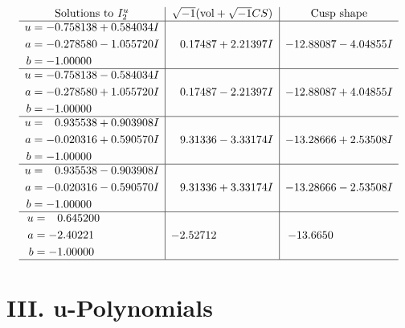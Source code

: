 \documentclass[1p]{elsarticle_modified}
\theoremstyle{definition}
\newcommand{\I}{\sqrt{-1}}
\begin{document}
$$\begin{array}{c|c|c}  
\text{Solutions to }I^u_{2}& \I (\text{vol} + \sqrt{-1}CS) & \text{Cusp shape}\\
 \hline 
\begin{aligned}
u &= -0.758138 + 0.584034 I \\
a &= -0.278580 - 1.055720 I \\
b &= -1.00000\phantom{ +0.000000I}\end{aligned}
 & \phantom{-}0.17487 + 2.21397 I & -12.88087 - 4.04855 I \\ \hline\begin{aligned}
u &= -0.758138 - 0.584034 I \\
a &= -0.278580 + 1.055720 I \\
b &= -1.00000\phantom{ +0.000000I}\end{aligned}
 & \phantom{-}0.17487 - 2.21397 I & -12.88087 + 4.04855 I \\ \hline\begin{aligned}
u &= \phantom{-}0.935538 + 0.903908 I \\
a &= -0.020316 + 0.590570 I \\
b &= -1.00000\phantom{ +0.000000I}\end{aligned}
 & \phantom{-}9.31336 - 3.33174 I & -13.28666 + 2.53508 I \\ \hline\begin{aligned}
u &= \phantom{-}0.935538 - 0.903908 I \\
a &= -0.020316 - 0.590570 I \\
b &= -1.00000\phantom{ +0.000000I}\end{aligned}
 & \phantom{-}9.31336 + 3.33174 I & -13.28666 - 2.53508 I \\ \hline\begin{aligned}
u &= \phantom{-}0.645200\phantom{ +0.000000I} \\
a &= -2.40221\phantom{ +0.000000I} \\
b &= -1.00000\phantom{ +0.000000I}\end{aligned}
 & -2.52712\phantom{ +0.000000I} & -13.6650\phantom{ +0.000000I}\\
 \hline 
 \end{array}$$\newpage
\newpage\renewcommand{\arraystretch}{1}
\centering \section*{ III. u-Polynomials}
\end{document}
